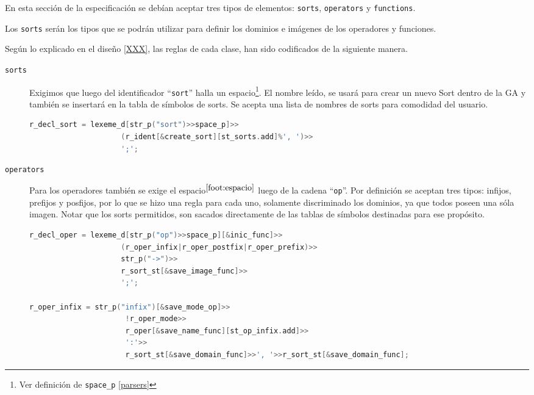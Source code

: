 En esta sección de la especificación se debían aceptar tres tipos de elementos: \texttt{sorts}, \texttt{operators} y \texttt{functions}.

Los \texttt{sorts} serán los tipos que se podrán utilizar para definir los dominios e imágenes de los operadores y funciones.

Según lo explicado en el diseño \ref{XXX}, las reglas de cada clase, han sido codificados de la siguiente manera.

\begin{description}
\item [\texttt{sorts}] Exigimos que luego del identificador ``\texttt{sort}'' halla un espacio\footnote{\label{foot:espacio} Ver definición de \texttt{space\_p} \ref{parsers}}. El nombre leído, se usará para crear un nuevo Sort dentro de la GA y también se insertará en la tabla de símbolos de sorts. Se acepta una lista de nombres de sorts para comodidad del usuario.

\begin{lstlisting}[language=C++, basicstyle=\scriptsize, columns=fullflexible, linewidth=9cm]
r_decl_sort = lexeme_d[str_p("sort")>>space_p]>>
                     (r_ident[&create_sort][st_sorts.add]%', ')>>
                     ';';
\end{lstlisting}

\item [\texttt{operators}] Para los operadores también se exige el espacio$^{\ref{foot:espacio}}$ luego de la cadena ``\texttt{op}''. Por definición se aceptan tres tipos: infijos, prefijos y posfijos, por lo que se hizo una regla para cada uno, solamente discriminado los dominios, ya que todos poseen una sóla imagen. Notar que los sorts permitidos, son sacados directamente de las tablas de símbolos destinadas para ese propósito.

\begin{lstlisting}[language=C++, basicstyle=\scriptsize, columns=fullflexible, linewidth=13cm]
r_decl_oper = lexeme_d[str_p("op")>>space_p][&inic_func]>>
                     (r_oper_infix|r_oper_postfix|r_oper_prefix)>>
                     str_p("->")>>
                     r_sort_st[&save_image_func]>>
                     ';';

r_oper_infix = str_p("infix")[&save_mode_op]>>
                      !r_oper_mode>>
                      r_oper[&save_name_func][st_op_infix.add]>>
                      ':'>>
                      r_sort_st[&save_domain_func]>>', '>>r_sort_st[&save_domain_func];


\end{lstlisting}
\end{description}
